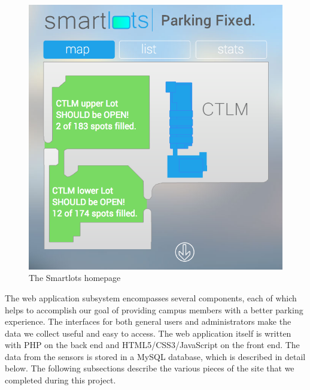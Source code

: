 \documentclass[11pt, oneside, fullpage, doublespace]{article}
\begin{document}
\begin{figure}
\begin{center}
\includegraphics[width=4.5in]{homepage}
\end{center}
\caption{The Smartlots homepage}
\label{fig:homepage}
\end{figure}

The web application subsystem encompasses several components, each of which helps to accomplish our goal of providing campus members with a better parking experience. The interfaces for both general users and administrators make the data we collect useful and easy to access. The web application itself is written with PHP on the back end and HTML5/CSS3/JavaScript on the front end. The data from the sensors is stored in a MySQL database, which is described in detail below. The following subsections describe the various pieces of the site that we completed during this project.
\end{document}
